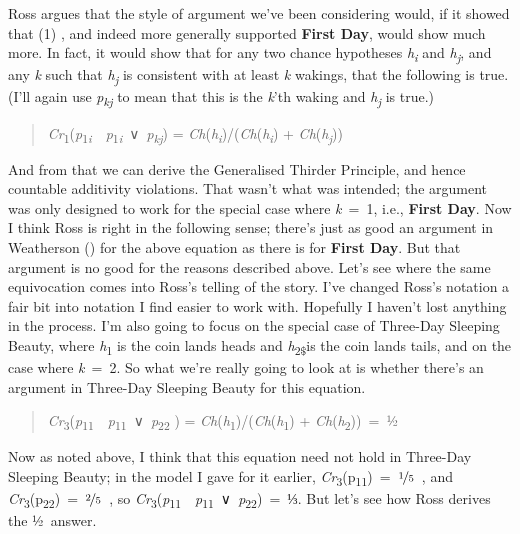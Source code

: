 \documentclass[
  11pt,
  letterpaper,
  DIV=11,
  numbers=noendperiod,
  twoside]{scrartcl}
\begin{document}
Ross argues that the style of argument we've been considering would, if
it showed that (1) , and indeed more generally supported \textbf{First
Day}, would show much more. In fact, it would show that for any two
chance hypotheses \emph{h\textsubscript{i}} and
\emph{h\textsubscript{j}}, and any \emph{k} such that
\emph{h\textsubscript{j}} is consistent with at least \emph{k} wakings,
that the following is true. (I'll again use \emph{p\textsubscript{kj}}
to mean that this is the \emph{k}'th waking and
\emph{h\textsubscript{j}} is true.)

\begin{quote}
\emph{Cr}\textsubscript{1}(\emph{p}\textsubscript{1\emph{i}}~\textbar~\emph{p}\textsubscript{1\emph{i}}~∨~\emph{p\textsubscript{kj}})
=
\emph{Ch}(\emph{h\textsubscript{i}})/(\emph{Ch}(\emph{h\textsubscript{i}})
+ \emph{Ch}(\emph{h\textsubscript{j}}))
\end{quote}

And from that we can derive the Generalised Thirder Principle, and hence
countable additivity violations. That wasn't what was intended; the
argument was only designed to work for the special case where
\emph{k}~=~1, i.e., \textbf{First Day}. Now I think Ross is right in the
following sense; there's just as good an argument in Weatherson
() for the above equation as there
is for \textbf{First Day}. But that argument is no good for the reasons
described above. Let's see where the same equivocation comes into Ross's
telling of the story. I've changed Ross's notation a fair bit into
notation I find easier to work with. Hopefully I haven't lost anything
in the process. I'm also going to focus on the special case of Three-Day
Sleeping Beauty, where \emph{h}\textsubscript{1} is the coin lands heads
and \emph{h}\textsubscript{2\$}is the coin lands tails, and on the case
where \emph{k}~=~2. So what we're really going to look at is whether
there's an argument in Three-Day Sleeping Beauty for this equation.

\begin{quote}
\emph{Cr}\textsubscript{3}(\emph{p}\textsubscript{11}~\textbar~\emph{p}\textsubscript{11}~∨~\emph{p}\textsubscript{22}
) =
\emph{Ch}(\emph{h}\textsubscript{1})/(\emph{Ch}(\emph{h}\textsubscript{1})
+ \emph{Ch}(\emph{h}\textsubscript{2}))~=~½
\end{quote}

Now as noted above, I think that this equation need not hold in
Three-Day Sleeping Beauty; in the model I gave for it earlier,
\emph{Cr}\textsubscript{3}(p\textsubscript{11})~=~\(\nicefrac{1}{5}\)~,
and
\emph{Cr}\textsubscript{3}(p\textsubscript{22})~=~\(\nicefrac{2}{5}\)~,
so
\emph{Cr}\textsubscript{3}(\emph{p}\textsubscript{11}~\textbar~\emph{p}\textsubscript{11}~∨~\emph{p}\textsubscript{22})~=~⅓.
But let's see how Ross derives the ½~answer.
\end{document}
